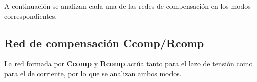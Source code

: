 
A continuación se analizan cada una de las redes de compensación en los modos correspondientes.

\clearpage


\subsection{Red de compensación Ccomp/Rcomp}

La red formada por \textbf{Ccomp} y \textbf{Rcomp} actúa tanto para el lazo de tensión como para el de corriente, por lo que se analizan ambos modos.

\clearpage





\clearpage




